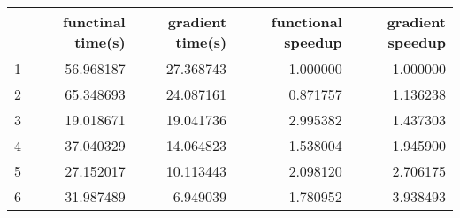 \begin{tabular}{lrrrr}
\toprule
{} &  functinal time(s) &  gradient time(s) &  functional speedup &  gradient speedup \\
\midrule
1 &          56.968187 &         27.368743 &            1.000000 &          1.000000 \\
2 &          65.348693 &         24.087161 &            0.871757 &          1.136238 \\
3 &          19.018671 &         19.041736 &            2.995382 &          1.437303 \\
4 &          37.040329 &         14.064823 &            1.538004 &          1.945900 \\
5 &          27.152017 &         10.113443 &            2.098120 &          2.706175 \\
6 &          31.987489 &          6.949039 &            1.780952 &          3.938493 \\
\bottomrule
\end{tabular}
